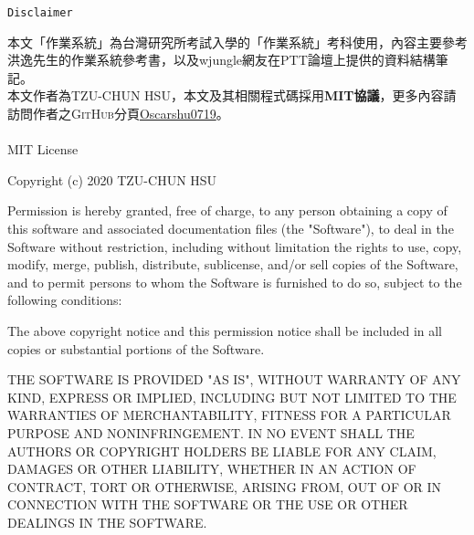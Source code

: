 \begin{center}
    \Huge{\texttt{Disclaimer}}\\
\end{center}

本文「作業系統」為台灣研究所考試入學的「作業系統」考科使用，內容主要參考洪逸先生的作業系統參考書\cite{1}，以及wjungle網友在PTT論壇上提供的資料結構筆記\cite{2}。 \\
本文作者為\textsc{TZU-CHUN HSU}，本文及其相關程式碼採用\textbf{MIT協議}，更多內容請訪問作者之\textsc{GitHub}分頁\href{https://github.com/Oscarshu0719}{Oscarshu0719}。 \\~\\

\con
MIT License

Copyright (c) 2020 TZU-CHUN HSU

Permission is hereby granted, free of charge, to any person obtaining a copy
of this software and associated documentation files (the "Software"), to deal
in the Software without restriction, including without limitation the rights
to use, copy, modify, merge, publish, distribute, sublicense, and/or sell
copies of the Software, and to permit persons to whom the Software is
furnished to do so, subject to the following conditions:

The above copyright notice and this permission notice shall be included in all
copies or substantial portions of the Software.

THE SOFTWARE IS PROVIDED "AS IS", WITHOUT WARRANTY OF ANY KIND, EXPRESS OR
IMPLIED, INCLUDING BUT NOT LIMITED TO THE WARRANTIES OF MERCHANTABILITY,
FITNESS FOR A PARTICULAR PURPOSE AND NONINFRINGEMENT. IN NO EVENT SHALL THE
AUTHORS OR COPYRIGHT HOLDERS BE LIABLE FOR ANY CLAIM, DAMAGES OR OTHER
LIABILITY, WHETHER IN AN ACTION OF CONTRACT, TORT OR OTHERWISE, ARISING FROM,
OUT OF OR IN CONNECTION WITH THE SOFTWARE OR THE USE OR OTHER DEALINGS IN THE
SOFTWARE.

\tnr
\pagebreak
